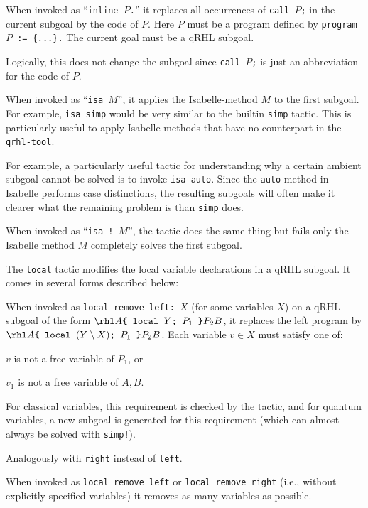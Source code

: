 \documentclass{article}
\begin{document}

When invoked as ``\texttt{inline $P$.}''
it replaces all occurrences of \texttt{call $P$;}
in the current subgoal by the code of $P$.
Here $P$
must be a program defined by \texttt{program $P$ := \{...\}.}
The current goal must be a qRHL subgoal.

Logically, this does not change the subgoal since \texttt{call $P$;}
is just an abbreviation for the code of $P$.


When invoked as ``\texttt{isa $M$}'', it applies the Isabelle-method
$M$ to the first subgoal. For example, \texttt{isa simp} would be very
similar to the builtin \texttt{simp} tactic. This is particularly
useful to apply Isabelle methods that have no counterpart in the
\texttt{qrhl-tool}.

For example, a particularly useful tactic for understanding why a
certain ambient subgoal cannot be solved is to invoke \texttt{isa
  auto}. Since the \texttt{auto} method in Isabelle performs case
distinctions, the resulting subgoals will often make it clearer what
the remaining problem is than \texttt{simp} does.

When invoked as ``\texttt{isa ! $M$}'', the tactic does the same thing
but fails only the Isabelle method $M$ completely solves the first
subgoal.



The \texttt{local} tactic modifies the local variable declarations in
a qRHL subgoal. It comes in several forms described below:

When invoked as \texttt{local remove left: $X$} (for some variables $X$) on a
qRHL subgoal of the form $\rhl A{\texttt{\{~local $Y$;
    $P_1$~\}}}{P_2} B$, it replaces the left program by
$\rhl A{\texttt{\{~local $(Y\setminus X)$; $P_1$~\}}}{P_2} B$.
Each variable $v\in X$ must satisfy one of:
\begin{compactitem}
  \item $v$ is not a free variable of $P_1$, or
  \item $v_1$ is not a free variable of $A,B$.
\end{compactitem}
For classical variables, this requirement is checked by the tactic,
and for quantum variables, a new subgoal is generated for this
requirement (which can almost always be solved with \texttt{simp!}).

Analogously with \texttt{right} instead of \texttt{left}.

When invoked as \texttt{local remove left} or \texttt{local remove
  right} (i.e., without explicitly specified variables) it removes as
many variables as possible.
\end{document}
